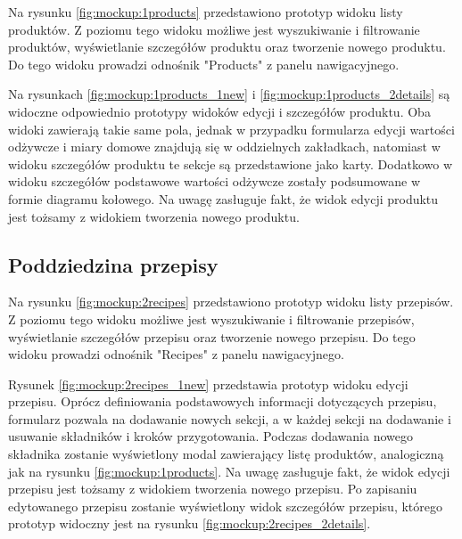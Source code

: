 Na rysunku \ref{fig:mockup:1products} przedstawiono prototyp widoku listy produktów.
Z poziomu tego widoku możliwe jest wyszukiwanie i filtrowanie produktów, wyświetlanie szczegółów produktu oraz tworzenie nowego produktu.
Do tego widoku prowadzi odnośnik "Products" z panelu nawigacyjnego.


Na rysunkach \ref{fig:mockup:1products_1new} i \ref{fig:mockup:1products_2details} są widoczne odpowiednio prototypy widoków edycji i szczegółów produktu.
Oba widoki zawierają takie same pola, jednak w przypadku formularza edycji wartości odżywcze i miary domowe znajdują się w oddzielnych zakładkach,
natomiast w widoku szczegółów produktu te sekcje są przedstawione jako karty.
Dodatkowo w widoku szczegółów podstawowe wartości odżywcze zostały podsumowane w formie diagramu kołowego.
Na uwagę zasługuje fakt, że widok edycji produktu jest tożsamy z widokiem tworzenia nowego produktu.



\subsection{Poddziedzina przepisy}

Na rysunku \ref{fig:mockup:2recipes} przedstawiono prototyp widoku listy przepisów.
Z poziomu tego widoku możliwe jest wyszukiwanie i filtrowanie przepisów, wyświetlanie szczegółów przepisu oraz tworzenie nowego przepisu.
Do tego widoku prowadzi odnośnik "Recipes" z panelu nawigacyjnego.


Rysunek \ref{fig:mockup:2recipes_1new} przedstawia prototyp widoku edycji przepisu.
Oprócz definiowania podstawowych informacji dotyczących przepisu, formularz pozwala na dodawanie nowych sekcji, a w każdej sekcji na dodawanie i usuwanie składników i kroków przygotowania.
Podczas dodawania nowego składnika zostanie wyświetlony modal zawierający listę produktów, analogiczną jak na rysunku \ref{fig:mockup:1products}.
Na uwagę zasługuje fakt, że widok edycji przepisu jest tożsamy z widokiem tworzenia nowego przepisu.
Po zapisaniu edytowanego przepisu zostanie wyświetlony widok szczegółów przepisu, którego prototyp widoczny jest na rysunku \ref{fig:mockup:2recipes_2details}.

